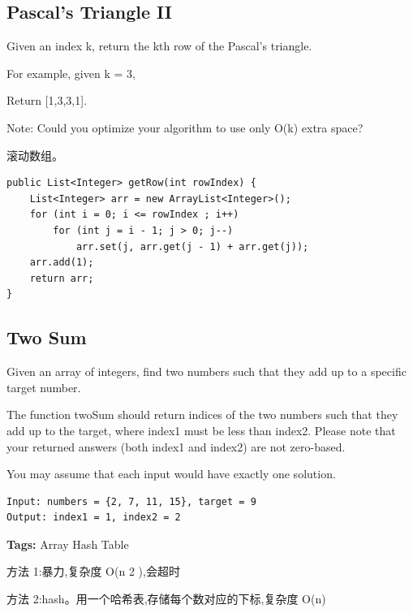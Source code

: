 \documentclass[12pt]{book}
\begin{document}
\subsection{Pascal's Triangle II}
\label{sec-20-1-2}
Given an index k, return the kth row of the Pascal's triangle.

For example, given k = 3,

Return [1,3,3,1].

Note:
Could you optimize your algorithm to use only O(k) extra space?

滚动数组。

\lstset{language=java,label= ,caption= ,numbers=none}
\begin{lstlisting}
public List<Integer> getRow(int rowIndex) {
    List<Integer> arr = new ArrayList<Integer>();
    for (int i = 0; i <= rowIndex ; i++) 
        for (int j = i - 1; j > 0; j--) 
            arr.set(j, arr.get(j - 1) + arr.get(j));
    arr.add(1);
    return arr;
}
\end{lstlisting}

\subsection{Two Sum}
\label{sec-20-1-3}
Given an array of integers, find two numbers such that they add up to a specific target number.

The function twoSum should return indices of the two numbers such that they add up to the target, where index1 must be less than index2. Please note that your returned answers (both index1 and index2) are not zero-based.

You may assume that each input would have exactly one solution.
\lstset{language=java,label= ,caption= ,numbers=none}
\begin{lstlisting}
Input: numbers = {2, 7, 11, 15}, target = 9
Output: index1 = 1, index2 = 2
\end{lstlisting}

\textbf{Tags:} Array Hash Table

方法 1:暴力,复杂度 O(n 2 ),会超时

方法 2:hash。用一个哈希表,存储每个数对应的下标,复杂度 O(n)
\end{document}

